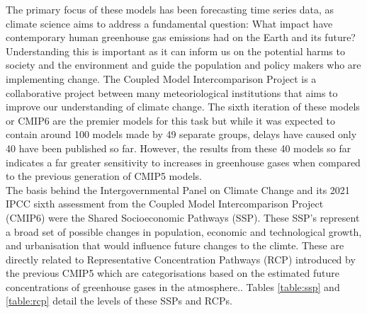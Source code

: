 \documentclass[honours,12pt]{unswthesis}
\numberwithin{equation}{section}
\begin{document}
{\noindent}The primary focus of these models has been forecasting time series data, as climate science aims to address a fundamental question: 
What impact have contemporary human greenhouse gas emissions had on the Earth and its future?
Understanding this is important as it can inform us on the potential harms to society and the environment and guide the population and policy makers who are implementing change.
The Coupled Model Intercomparison Project is a collaborative project between many meteoriological institutions that aims to improve our understanding of climate change.
The sixth iteration of these models or CMIP6 are the premier models for this task but while it was expected to contain around 100 models made by 49 separate groups, 
delays have caused only 40 have been published so far.
However, the results from these 40 models so far indicates a far greater sensitivity to increases in greenhouse gases when compared to the previous generation of CMIP5 models.\cite{Harrisson_2021}\\

{\noindent}The basis behind the Intergovernmental Panel on Climate Change and its 2021 IPCC sixth assessment from the Coupled Model Intercomparison Project (CMIP6) were the Shared Socioeconomic Pathways (SSP).\cite{lee2021future}
These SSP's represent a broad set of possible changes in population, economic and technological growth, and urbanisation that would influence future changes to the climte.\cite{RIAHI2017153}  
These are directly related to Representative Concentration Pathways (RCP) introduced by the previous CMIP5 which are categorisations based on the 
estimated future concentrations of greenhouse gases in the atmosphere.\cite{Harrisson_2021_SSP}.
Tables \ref{table:ssp} and \ref{table:rcp} detail the levels of these SSPs and RCPs.
\end{document}
